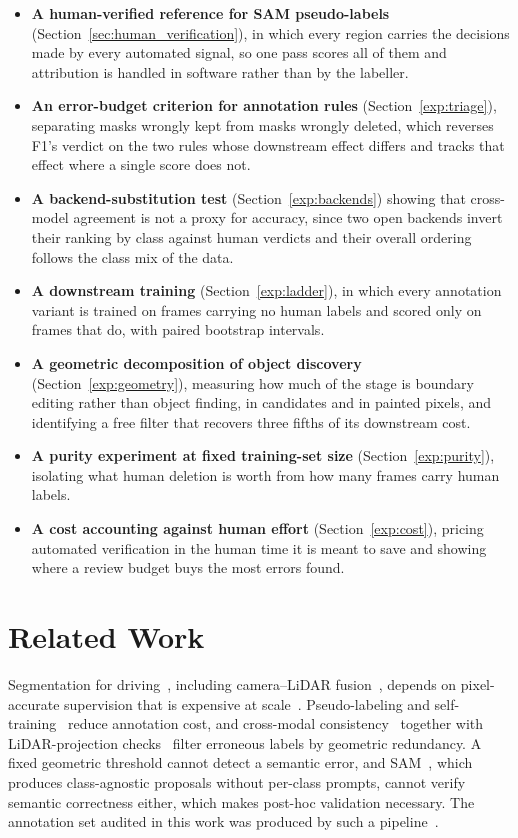 \documentclass[journal]{IEEEtran}
\begin{document}
\begin{itemize}
  \item \textbf{A human-verified reference for SAM pseudo-labels} (Section~\ref{sec:human_verification}), in which every region carries the decisions made by every automated signal, so one pass scores all of them and attribution is handled in software rather than by the labeller.
  \item \textbf{An error-budget criterion for annotation rules} (Section~\ref{exp:triage}), separating masks wrongly kept from masks wrongly deleted, which reverses F1's verdict on the two rules whose downstream effect differs and tracks that effect where a single score does not.
  \item \textbf{A backend-substitution test} (Section~\ref{exp:backends}) showing that cross-model agreement is not a proxy for accuracy, since two open backends invert their ranking by class against human verdicts and their overall ordering follows the class mix of the data.
  \item \textbf{A downstream training} (Section~\ref{exp:ladder}), in which every annotation variant is trained on frames carrying no human labels and scored only on frames that do, with paired bootstrap intervals.
  \item \textbf{A geometric decomposition of object discovery} (Section~\ref{exp:geometry}), measuring how much of the stage is boundary editing rather than object finding, in candidates and in painted pixels, and identifying a free filter that recovers three fifths of its downstream cost.
  \item \textbf{A purity experiment at fixed training-set size} (Section~\ref{exp:purity}), isolating what human deletion is worth from how many frames carry human labels.
  \item \textbf{A cost accounting against human effort} (Section~\ref{exp:cost}), pricing automated verification in the human time it is meant to save and showing where a review budget buys the most errors found.
\end{itemize}


\section{Related Work}
\label{sec:related_work}

Segmentation for driving~\cite{long2015fcn,zhao2017psp,chen2018deeplab}, including camera–LiDAR fusion~\cite{valada2019selfsupervised,jaritz2019multimodal}, depends on pixel-accurate supervision that is expensive at scale~\cite{cordts2016cityscapes}.  
Pseudo-labeling and self-training~\cite{lee2013pseudo,zou2019confidence} reduce annotation cost, and cross-modal consistency~\cite{jaritz2020xmuda} together with LiDAR-projection checks~\cite{behley2019semantickitti,caesar2020nuscenes} filter erroneous labels by geometric redundancy.  
A fixed geometric threshold cannot detect a semantic error, and SAM~\cite{kirillov2023sam}, which produces class-agnostic proposals without per-class prompts, cannot verify semantic correctness either, which makes post-hoc validation necessary.  
The annotation set audited in this work was produced by such a pipeline~\cite{tahves2026samenhancedsegmentationroaddatasets}.
\end{document}
